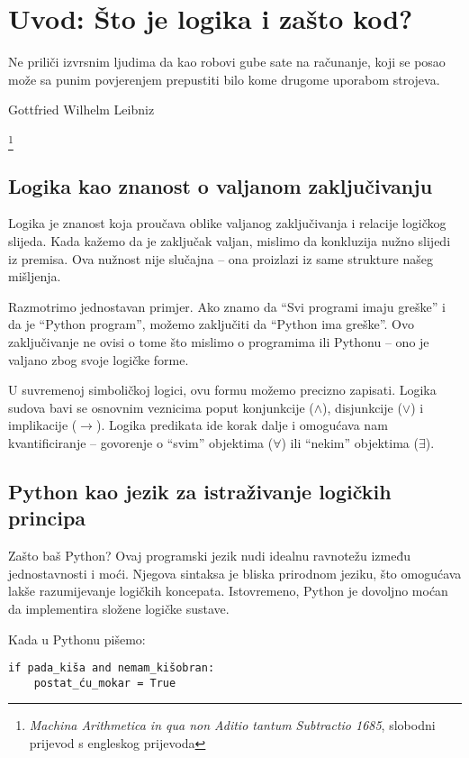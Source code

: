 
\chapter{Uvod: Što je logika i zašto kod?}

\epigraph{Ne priliči izvrsnim ljudima da kao robovi gube sate na računanje, koji se posao može sa punim povjerenjem prepustiti bilo kome drugome uporabom strojeva.}{Gottfried Wilhelm Leibniz}\footnote{\emph{Machina Arithmetica in qua non Aditio tantum Subtractio 1685}, slobodni prijevod s engleskog prijevoda}

\section*{Logika kao znanost o valjanom zaključivanju}

Logika je znanost koja proučava oblike valjanog zaključivanja i relacije logičkog slijeda. Kada kažemo da je zaključak valjan, mislimo da konkluzija nužno slijedi iz premisa. Ova nužnost nije slučajna – ona proizlazi iz same strukture našeg mišljenja.

Razmotrimo jednostavan primjer. Ako znamo da ``Svi programi imaju greške'' i da je ``Python program'', možemo zaključiti da ``Python ima greške''. Ovo zaključivanje ne ovisi o tome što mislimo o programima ili Pythonu -- ono je valjano zbog svoje logičke forme.

U suvremenoj simboličkoj logici, ovu formu možemo precizno zapisati. Logika sudova bavi se osnovnim veznicima poput konjunkcije ($\wedge$), disjunkcije ($\vee$) i implikacije ($\rightarrow$). Logika predikata ide korak dalje i omogućava nam kvantificiranje -- govorenje o ``svim'' objektima ($\forall$) ili ``nekim'' objektima ($\exists$).

\section*{Python kao jezik za istraživanje logičkih principa}

Zašto baš Python? Ovaj programski jezik nudi idealnu ravnotežu između jednostavnosti i moći. Njegova sintaksa je bliska prirodnom jeziku, što omogućava lakše razumijevanje logičkih koncepata. Istovremeno, Python je dovoljno moćan da implementira složene logičke sustave.

Kada u Pythonu pišemo:
\begin{verbatim}
if pada_kiša and nemam_kišobran:
    postat_ću_mokar = True
\end{verbatim}


